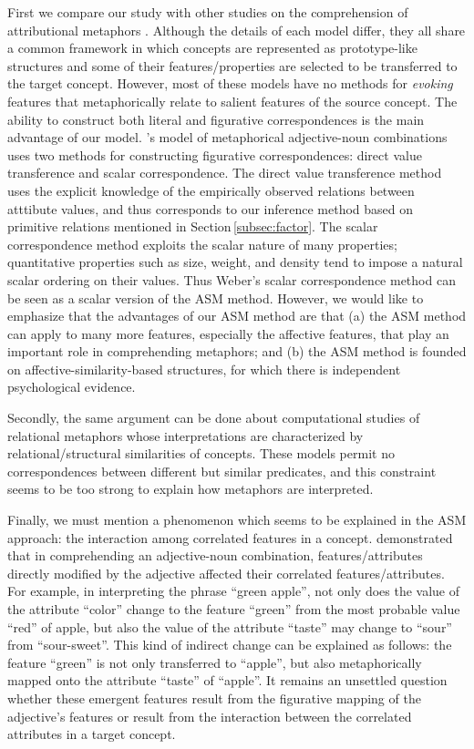 First we compare our study with other studies on the comprehension of
attributional metaphors \cite{Ortony79,Weiner84,Iwayama90,Weber91}.
Although the details of each model differ, they all share a
common framework in which concepts are represented as prototype-like
structures and some of their features/properties are selected to be
transferred to the target concept. 
However, most of these models have no methods for 
{\it evoking\/} features that metaphorically
relate to salient features of the source concept. 
The ability to construct both literal and figurative
correspondences is the main advantage of our model.  
\citeauthor{Weber91}'s\citeyear{Weber91} model of metaphorical adjective-noun 
combinations uses two methods for constructing figurative correspondences:
direct value transference and scalar correspondence.
The direct value transference method uses 
the explicit knowledge of the empirically observed relations between atttibute values,
and thus corresponds to 
our inference method based on primitive relations mentioned in Section\,\ref{subsec:factor}.
The scalar correspondence method exploits the scalar nature of many properties; 
quantitative properties such as size, weight, and density 
tend to impose a natural scalar ordering on their values. 
Thus Weber's scalar correspondence method can be seen as a scalar version of the ASM
method. However, we would like to emphasize that the advantages of our ASM method are that
(a) the ASM method can apply to many more features, especially the affective
features, that play an important role in comprehending metaphors; and
(b) the ASM method is founded on affective-similarity-based structures, for which
there is independent psychological evidence.

Secondly, the same argument can be done about computational studies 
\cite{Falkenhainer86,Indurkhya87,Fass91,Martin92}
of relational metaphors whose interpretations 
are characterized by relational/structural similarities of concepts.
These models permit no correspondences between different but similar predicates, 
and this constraint seems to be too strong to explain how metaphors are interpreted.

Finally, we must mention a phenomenon which seems to be explained in the ASM approach: 
the interaction among correlated features in a concept. 
 demonstrated that in comprehending an adjective-noun combination,
features/attributes directly modified by the adjective affected
their correlated features/attributes. For example, in interpreting
the phrase ``green apple'', not only does the value of the attribute
``color'' change to the feature ``green'' from the most probable value ``red''
of apple, but also the value of the attribute ``taste'' may change to ``sour'' 
from ``sour-sweet''.  This kind of indirect change
can be explained as follows: the feature ``green'' is
not only transferred to ``apple'', but also metaphorically mapped onto
the attribute ``taste'' of ``apple''. 
It remains an unsettled question whether these emergent features 
result from the figurative mapping of
the adjective's features or result from the interaction between the
correlated attributes in a target concept.


